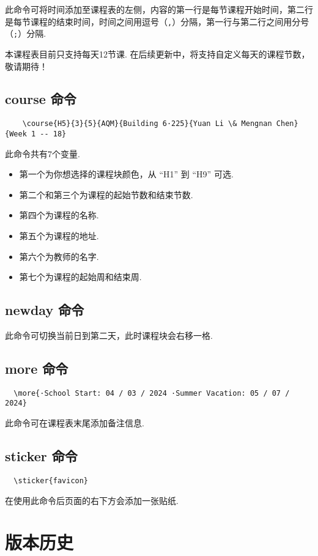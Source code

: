 \documentclass[11pt]{article}
\def\cmd#1{\texorpdfstring{\textcolor{cmdcolor}{\textsf{#1}}}{“#1”}}
\begin{document}
此命令可将时间添加至课程表的左侧，内容的第一行是每节课程开始时间，第二行是每节课程的结束时间，时间之间用逗号（\verb|,|）分隔，第一行与第二行之间用分号（\verb|;|）分隔.

本课程表目前只支持每天12节课. 在后续更新中，将支持自定义每天的课程节数，敬请期待！

\subsection{\cmd{course} 命令}
\begin{verbatim}
    \course{H5}{3}{5}{AQM}{Building 6·225}{Yuan Li \& Mengnan Chen}{Week 1 -- 18}
\end{verbatim}

此命令共有7个变量.
\begin{itemize}
  \item 第一个为你想选择的课程块颜色，从 ``H1'' 到 ``H9'' 可选.
  \item 第二个和第三个为课程的起始节数和结束节数.
  \item 第四个为课程的名称.
  \item 第五个为课程的地址.
  \item 第六个为教师的名字.
  \item 第七个为课程的起始周和结束周.
\end{itemize}

\subsection{\cmd{newday} 命令}
此命令可切换当前日到第二天，此时课程块会右移一格.

\subsection{\cmd{more} 命令}
\begin{verbatim}
  \more{·School Start: 04 / 03 / 2024 ·Summer Vacation: 05 / 07 / 2024}
\end{verbatim}
此命令可在课程表末尾添加备注信息.

\subsection{\cmd{sticker} 命令}
\begin{verbatim}
  \sticker{favicon}
\end{verbatim}
在使用此命令后页面的右下方会添加一张贴纸.

\newpage
\section{版本历史}
\end{document}
